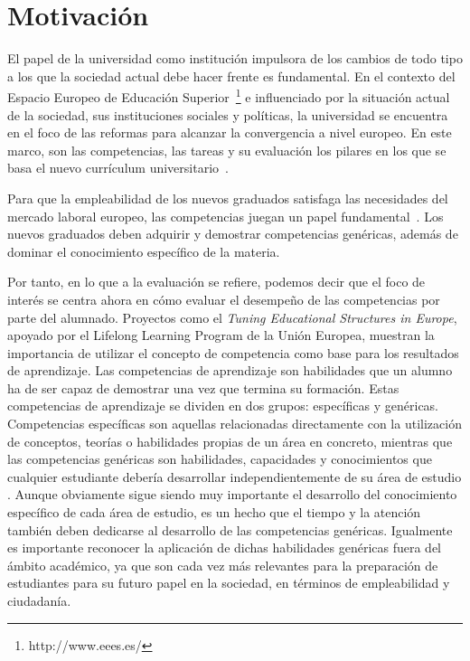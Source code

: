 


\section{Motivación}
\label{sec:Motivation}

El papel de la universidad como institución impulsora de los cambios de todo tipo a los que la sociedad actual debe hacer frente es fundamental. En el contexto del Espacio Europeo de Educación Superior~\footnote{http://www.eees.es/} e influenciado por la situación actual de  la sociedad, sus instituciones sociales y políticas, la universidad se encuentra en el foco de las reformas para alcanzar la convergencia a nivel europeo. En este marco, son las competencias, las tareas y su evaluación los pilares en los que se basa el nuevo currículum universitario~\cite{zabala2005espacio}.

Para que la empleabilidad de los nuevos graduados satisfaga las necesidades del mercado laboral europeo, las competencias juegan un papel fundamental~\cite{communique2012making}. Los nuevos graduados deben adquirir y demostrar competencias genéricas, además de dominar el conocimiento específico de la materia.

Por tanto, en lo que a la evaluación se refiere, podemos decir que el foco de interés se centra ahora en cómo evaluar el desempeño de las competencias por parte del alumnado. Proyectos como el \emph{Tuning Educational Structures in Europe}, apoyado por el Lifelong Learning Program de la Unión Europea, muestran la importancia de utilizar el concepto de competencia como base para los resultados de aprendizaje. Las competencias de aprendizaje son habilidades que un alumno ha de ser capaz de demostrar una vez que termina su formación. Estas competencias de aprendizaje se dividen en dos grupos: específicas y genéricas. Competencias específicas son aquellas relacionadas directamente con la utilización de conceptos, teorías o habilidades propias de un área en concreto, mientras que las competencias genéricas son habilidades, capacidades y conocimientos que cualquier estudiante debería desarrollar independientemente de su área de estudio \cite{gonzalez2003tuning}. Aunque obviamente sigue siendo muy importante el desarrollo del conocimiento específico de cada área de estudio, es un hecho que el tiempo y la atención también deben dedicarse al desarrollo de las competencias genéricas. Igualmente es importante reconocer la aplicación de dichas habilidades genéricas fuera del ámbito académico, ya que son cada vez más relevantes para la preparación de estudiantes para su futuro papel en la sociedad, en términos de empleabilidad y ciudadanía.

